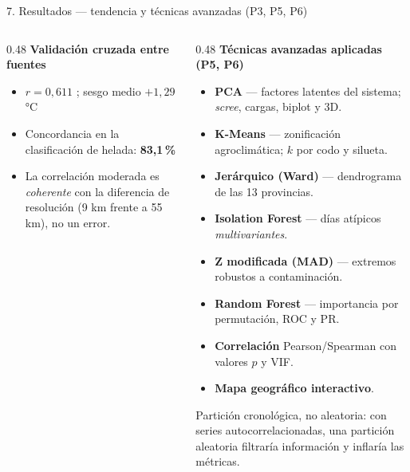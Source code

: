 \documentclass[aspectratio=169,11pt]{beamer}
\begin{document}
\begin{frame}{7. Resultados — tendencia y técnicas avanzadas (P3, P5, P6)}
\begin{columns}[T]
\begin{column}{0.48\textwidth}
      \vspace{0.6em}
      \textbf{Validación cruzada entre fuentes}
      \begin{itemize}\itemsep0.15em
        \item $r = 0{,}611$ ; sesgo medio $+1{,}29$ °C
        \item Concordancia en la clasificación de helada: \textbf{83,1\,\%}
        \item La correlación moderada es \emph{coherente} con la diferencia de resolución
              (9 km frente a 55 km), no un error.
      \end{itemize}
    \end{column}
    \begin{column}{0.48\textwidth}
      \textbf{Técnicas avanzadas aplicadas (P5, P6)}
      \begin{itemize}\itemsep0.12em
        \item \textbf{PCA} — factores latentes del sistema; \emph{scree}, cargas, biplot y 3D.
        \item \textbf{K-Means} — zonificación agroclimática; $k$ por codo y silueta.
        \item \textbf{Jerárquico (Ward)} — dendrograma de las 13 provincias.
        \item \textbf{Isolation Forest} — días atípicos \emph{multivariantes}.
        \item \textbf{Z modificada (MAD)} — extremos robustos a contaminación.
        \item \textbf{Random Forest} — importancia por permutación, ROC y PR.
        \item \textbf{Correlación} Pearson/Spearman con valores $p$ y VIF.
        \item \textbf{Mapa geográfico interactivo}.
      \end{itemize}
      \vspace{0.3em}
      {\tiny\textcolor{pnInkSoft}{Partición cronológica, no aleatoria: con series autocorrelacionadas,
      una partición aleatoria filtraría información y inflaría las métricas.}}
    \end{column}
  \end{columns}
\end{frame}
\end{document}
